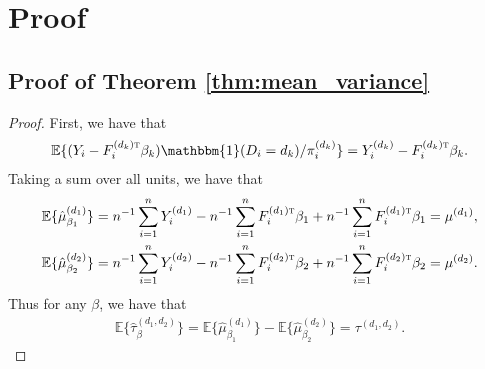 \documentclass{article}
\theoremstyle{plain}
\theoremstyle{definition}
\theoremstyle{remark}
\newcommand{\E}{\mathbb{E}}
\def\T{{\textsc{t}}}
\newcommand{\indicator}{\mathbbm{1}}
\newcommand{\sumi}{\sum_{i=1}^n}
\begin{document}
\section{Proof}\label{sec:proof}
\subsection{Proof of Theorem \ref{thm:mean_variance}}
\begin{proof}
    First, we have that
    \begin{eqnarray*}
        \E\{(Y_i - F_i^{(d_k)\T} \beta_k)\indicator(D_i=d_k)/\pi_i^{(d_k)}\} = Y_i^{(d_k)} - F_i^{(d_k)\T} \beta_k.
    \end{eqnarray*}
    Taking a sum over all units, we have that
    \begin{eqnarray*}
        \E\{\hat\mu{}^{(d_1)}_{\beta_1}\} = n^{-1} \sumi Y_i^{(d_1)} - n^{-1} \sumi F_i^{(d_1)\T} \beta_1 + n^{-1} \sumi F_i^{(d_1)\T} \beta_1 = \mu^{(d_1)}, \\
        \E\{\hat\mu{}^{(d_2)}_{\beta_2}\} = n^{-1} \sumi Y_i^{(d_2)} - n^{-1} \sumi F_i^{(d_2)\T} \beta_2 + n^{-1} \sumi F_i^{(d_2)\T} \beta_2 = \mu^{(d_2)}.
    \end{eqnarray*} 
    Thus for any $\beta$, we have that
    \begin{eqnarray*}
        \E\{\hat\tau^{(d_1, d_2)}_{\beta}\} = \E\{\hat\mu^{(d_1)}_{\beta_1}\} - \E\{\hat\mu^{(d_2)}_{\beta_2}\} = \tau^{(d_1, d_2)}.
    \end{eqnarray*}


\end{proof}
\end{document}
